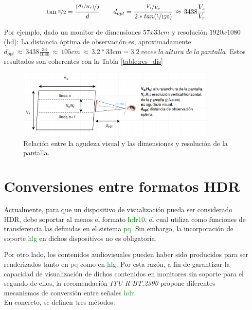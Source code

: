 \documentclass[a4paper, 12pt]{report}
\begin{document}
\begin{equation} \label{eq:res_dis}
    \tan{\nicefrac{\alpha}{2}}= \frac{\nicefrac{(\nicefrac{H_{s}}{H_{r}})}{2}}{d} \qquad
    d_{opt}= \frac{\nicefrac{V_{s}}{V_{r}}}{2*tan(\nicefrac{1}{120})}\, \approx\,3438 \frac{V_{s}}{V_{r}}
\end{equation}
 
 Por ejemplo, dado un monitor de dimensiones $57x33cm$ y resolución $1920x1080$ (\textcolor{green}{hd}):
 La distancia óptima de observación es, aproximadamente $d_{opt}\, \approx \, 3438\frac{33}{1080}\, \approx \, 105 cm \, \approx \, 3.2 *33cm = 3.2 \: veces\: la\:  altura \: de \: la\:  pantalla\:$
 Estos resultados son coherentes con la Tabla \ref{table:res_dis}

\begin{figure}[H]
  \centering
  \includegraphics[width=10cm, keepaspectratio]{img/4_Formatos_de_TV_HDR/4_5_Condiciones_de_Referencia/1_resolution_vs_distance.png}
  \caption{Relación entre la agudeza visual y las dimensiones y resolución de la pantalla.}
  \label{fig:res_dist}
\end{figure}

\section{Conversiones entre formatos HDR}
\label{sec:conversiones_hdr}
Actualmente, para que un dispositivo de visualización pueda ser considerado HDR, debe soportar al menos el formato \textcolor{green}{hdr10}, el cual utiliza como funciones de transferencia las definidas en el sistema \textcolor{green}{pq}. Sin embargo, la incorporación de soporte \textcolor{green}{hlg} en dichos dispositivos no es obligatoria.

Por otro lado, los contenidos audiovisuales pueden haber sido producidos para ser renderizados  tanto en \textcolor{green}{pq} como en \textcolor{green}{hlg}. Por esta razón, a fin de  garantizar la capacidad de visualización de dichos contenidos en monitores sin soporte para el segundo de ellos, la  recomendación \textit{ITU-R BT.2390} propone diferentes mecanismos de conversión entre señales \textcolor{green}{hdr}.\\ En concreto, se definen tres métodos:
\end{document}
